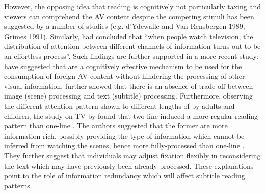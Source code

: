\documentclass[output=paper]{langsci/langscibook}
\begin{document}
However, the opposing idea that reading  is cognitively not particularly taxing and viewers can comprehend the AV content despite the competing stimuli has been suggested by a number of  studies (e.g. d'Ydewalle and Van Rensbergen 1989, Grimes 1991). Similarly, \citet[425]{dydewalle1992} had concluded that ``when people watch television, the distribution of attention between different channels of information turns out to be an effortless process''. Such findings are further supported in a more recent study: \citet{perego2010} have suggested that  are a cognitively effective mechanism to be used for the consumption of foreign AV content without hindering the processing of other visual information. \citet{perego2010} further showed that there is an absence of trade-off between image (scene) processing and text (subtitle) processing. Furthermore, observing the different attention pattern shown to different lengths of  by adults and children, the study on TV  by \citet{Bruycker2007} found that two-line  induced a more regular reading pattern than one-line . The authors suggested that the former are more information-rich, possibly providing the type of information which cannot be inferred from watching the scenes, hence more fully-processed than one-line . They further suggest that individuals may adjust fixation flexibly in reconsidering the text which may have previously been already processed.  These explanations point to the role of information redundancy which will affect subtitle reading patterns.
\end{document}
